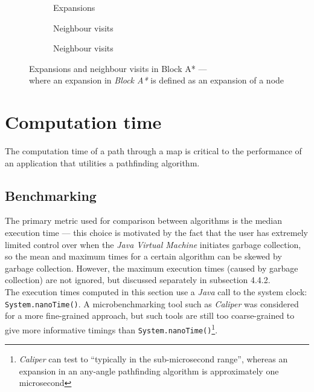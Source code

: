 \documentclass[12pt,notitlepage]{report}
\begin{document}
\begin{figure}
\centering
  \begin{subfigure}{0.32\textwidth}
  \centering
  
  \caption{Expansions}
  \end{subfigure}
  \begin{subfigure}{0.32\textwidth}
  \centering
  
  \caption{Neighbour visits}
  \end{subfigure}
  \begin{subfigure}{0.32\textwidth}
  \centering
  
  \caption{Neighbour visits}
  \end{subfigure}
\caption[Expansions and neighbour visits in Block A*]{Expansions and neighbour visits in Block A* --- \\ where an expansion in {\em Block A*} is defined as an expansion of a node}
\end{figure}

\section{Computation time}
The computation time of a path through a map is critical to the performance of an application that utilities a pathfinding algorithm.

\subsection{Benchmarking}
The primary metric used for comparison between algorithms is the median execution time --- this choice is motivated by the fact that the user has extremely limited control over when the {\em Java Virtual Machine} initiates garbage collection, so the mean and maximum times for a certain algorithm can be skewed by garbage collection. However, the maximum execution times (caused by garbage collection) are not ignored, but discussed separately in subsection 4.4.2.\\

\noindent
The execution times computed in this section use a {\em Java} call to the system clock: {\tt System.nanoTime()}. A microbenchmarking tool such as {\em Caliper}\cite{Caliper} was considered for a more fine-grained approach, but such tools are still too coarse-grained to give more informative timings than {\tt System.nanoTime()}\footnote{{\em Caliper} can test to ``typically in the sub-microsecond range'', whereas an expansion in an any-angle pathfinding algorithm is approximately one microsecond}.
\end{document}
